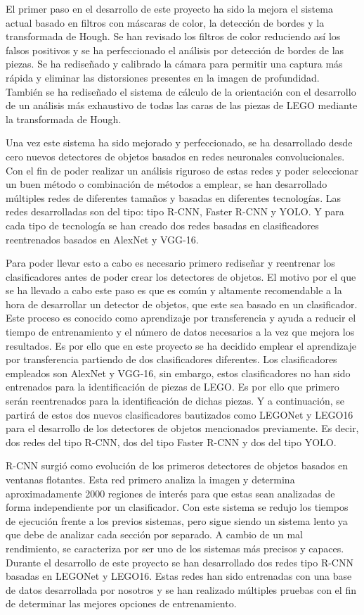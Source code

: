 {El primer paso en el desarrollo de este proyecto ha sido la mejora el sistema actual basado en filtros con máscaras de color, la detección de bordes y la transformada de Hough. Se han revisado los filtros de color reduciendo así los falsos positivos y se ha perfeccionado el análisis por detección de bordes de las piezas. Se ha rediseñado y calibrado la cámara para permitir una captura más rápida y eliminar las distorsiones presentes en la imagen de profundidad. También se ha rediseñado el sistema de cálculo de la orientación con el desarrollo de un análisis más exhaustivo de todas las caras de las piezas de LEGO mediante la transformada de Hough.

Una vez este sistema ha sido mejorado y perfeccionado, se ha desarrollado desde cero nuevos detectores de objetos basados en redes neuronales convolucionales. Con el fin de poder realizar un análisis riguroso de estas redes y poder seleccionar un buen método o combinación de métodos a emplear, se han desarrollado múltiples redes de diferentes tamaños y basadas en diferentes tecnologías. Las redes desarrolladas son del tipo: tipo R-CNN, Faster R-CNN y YOLO. Y para cada tipo de tecnología se han creado dos redes basadas en clasificadores reentrenados basados en AlexNet y VGG-16.

Para poder llevar esto a cabo es necesario primero rediseñar y reentrenar los clasificadores antes de poder crear los detectores de objetos. El motivo por el que se ha llevado a cabo este paso es que es común y altamente recomendable a la hora de desarrollar un detector de objetos, que este sea basado en un clasificador. Este proceso es conocido como aprendizaje por transferencia y ayuda a reducir el tiempo de entrenamiento y el número de datos necesarios a la vez que mejora los resultados. Es por ello que en este proyecto se ha decidido emplear el aprendizaje por transferencia partiendo de dos clasificadores diferentes. Los clasificadores empleados son AlexNet y VGG-16, sin embargo, estos clasificadores no han sido entrenados para la identificación de piezas de LEGO. Es por ello que primero serán reentrenados para la identificación de dichas piezas. Y a continuación, se partirá de estos dos nuevos clasificadores bautizados como LEGONet y LEGO16 para el desarrollo de los detectores de objetos mencionados previamente. Es decir, dos redes del tipo R-CNN, dos del tipo Faster R-CNN y dos del tipo YOLO.

R-CNN surgió como evolución de los primeros detectores de objetos basados en ventanas flotantes. Esta red primero analiza la imagen y determina aproximadamente 2000 regiones de interés para que estas sean analizadas de forma independiente por un clasificador. Con este sistema se redujo los tiempos de ejecución frente a los previos sistemas, pero sigue siendo un sistema lento ya que debe de analizar cada sección por separado. A cambio de un mal rendimiento, se caracteriza por ser uno de los sistemas más precisos y capaces. Durante el desarrollo de este proyecto se han desarrollado dos redes tipo R-CNN basadas en LEGONet y LEGO16. Estas redes han sido entrenadas con una base de datos desarrollada por nosotros y se han realizado múltiples pruebas con el fin de determinar las mejores opciones de entrenamiento.

}
